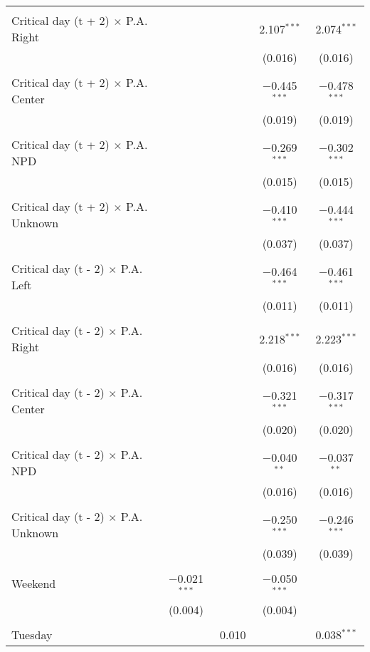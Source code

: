 \documentclass[
]{article}
\begin{document}
\begin{table}[!htbp]
{\begin{tabular}{@{\extracolsep{5pt}}lcccc}
  & & & & \\ 
 Critical day (t + 2) $\times$ P.A. Right &  &  & 2.107$^{***}$ & 2.074$^{***}$ \\ 
  &  &  & (0.016) & (0.016) \\ 
  & & & & \\ 
 Critical day (t + 2) $\times$ P.A. Center &  &  & $-$0.445$^{***}$ & $-$0.478$^{***}$ \\ 
  &  &  & (0.019) & (0.019) \\ 
  & & & & \\ 
 Critical day (t + 2) $\times$ P.A. NPD &  &  & $-$0.269$^{***}$ & $-$0.302$^{***}$ \\ 
  &  &  & (0.015) & (0.015) \\ 
  & & & & \\ 
 Critical day (t + 2) $\times$ P.A. Unknown &  &  & $-$0.410$^{***}$ & $-$0.444$^{***}$ \\ 
  &  &  & (0.037) & (0.037) \\ 
  & & & & \\ 
 Critical day (t - 2) $\times$ P.A. Left &  &  & $-$0.464$^{***}$ & $-$0.461$^{***}$ \\ 
  &  &  & (0.011) & (0.011) \\ 
  & & & & \\ 
 Critical day (t - 2) $\times$ P.A. Right &  &  & 2.218$^{***}$ & 2.223$^{***}$ \\ 
  &  &  & (0.016) & (0.016) \\ 
  & & & & \\ 
 Critical day (t - 2) $\times$ P.A. Center &  &  & $-$0.321$^{***}$ & $-$0.317$^{***}$ \\ 
  &  &  & (0.020) & (0.020) \\ 
  & & & & \\ 
 Critical day (t - 2) $\times$ P.A. NPD &  &  & $-$0.040$^{**}$ & $-$0.037$^{**}$ \\ 
  &  &  & (0.016) & (0.016) \\ 
  & & & & \\ 
 Critical day (t - 2) $\times$ P.A. Unknown &  &  & $-$0.250$^{***}$ & $-$0.246$^{***}$ \\ 
  &  &  & (0.039) & (0.039) \\ 
  & & & & \\ 
 Weekend & $-$0.021$^{***}$ &  & $-$0.050$^{***}$ &  \\ 
  & (0.004) &  & (0.004) &  \\ 
  & & & & \\ 
 Tuesday &  & 0.010 &  & 0.038$^{***}$ \\ 

\end{tabular}}
\end{table}
\end{document}
